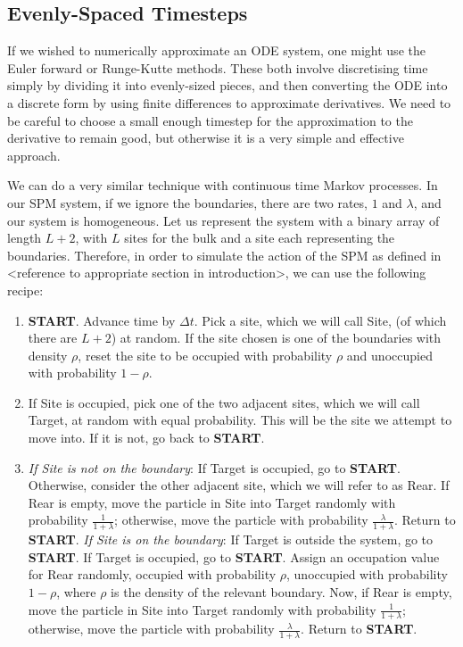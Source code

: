 \subsection{Evenly-Spaced Timesteps} \label{sec:evenTimesteps}

If we wished to numerically approximate an ODE system, one might use the Euler forward or 
Runge-Kutte methods. These both involve discretising time simply by dividing it into evenly-sized
pieces, and then converting the ODE into a discrete form by using finite differences to
approximate derivatives. We need to be careful to choose a small enough timestep for
the approximation to the derivative to remain good, but otherwise it is a very simple and 
effective approach.

We can do a very similar technique with continuous time Markov processes. In our SPM system,
if we ignore the boundaries, there are two rates, $1$ and $\lambda$, and our system is 
homogeneous. Let us represent the system with a binary array of length $L+2$, with $L$ sites for the bulk
and a site each representing the boundaries. Therefore, in order to simulate the action of the SPM as
defined in <reference to appropriate section in
introduction>, we can use the following recipe:
\begin{enumerate}
 \item \textbf{START}. Advance time by $\Delta t$. Pick a site, which we will call
 Site,
 (of which there are $L+2$) at random. If the site chosen is one of the boundaries with density $\rho$,
 reset the site to be occupied with probability $\rho$ and unoccupied with probability $1-\rho$.
 \item If Site is occupied, pick one of the two adjacent sites, which we will call Target, at random with equal probability.
 This will be the site we attempt to move into. If it is not, go back to \textbf{START}.
 \item \textit{If Site is not on the boundary}: If Target is occupied, go to \textbf{START}. Otherwise, consider the other adjacent site,
 which we will refer to as Rear. If Rear is empty, move the particle in Site into Target 
 randomly with
 probability $\frac{1}{1+\lambda}$; otherwise, move the particle with probability
 $\frac{\lambda}{1+\lambda}$. Return to \textbf{START}. 
 \newline \textit{If Site is on the boundary}: If Target is outside the system, go to \textbf{START}.
 If Target is occupied, go to \textbf{START}. Assign an occupation value for Rear randomly, occupied
 with probability $\rho$, unoccupied with probability $1-\rho$, where $\rho$ is the density of the relevant
 boundary. Now, if Rear is empty, move the particle in Site into Target 
 randomly with  probability $\frac{1}{1+\lambda}$; otherwise, move the particle with probability
 $\frac{\lambda}{1+\lambda}$. Return to \textbf{START}.
\end{enumerate}
